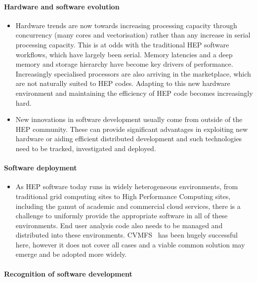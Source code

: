 \documentclass[12pt,a4paper]{article}
\begin{document}
\paragraph{Hardware and software evolution}

\begin{itemize}
\item
    Hardware trends are now towards increasing processing capacity through
  concurrency (many cores and vectorisation) rather than any increase in
  serial processing capacity. This is at odds with the traditional HEP
  software workflows, which have largely been serial. Memory latencies
  and a deep memory and storage hierarchy have become key drivers of
  performance. Increasingly specialised processors are also arriving in
  the marketplace, which are not naturally suited to HEP codes. Adapting
  to this new hardware environment and maintaining the efficiency of HEP
  code becomes increasingly hard.
  \item
    New innovations in software development usually come from outside of
  the HEP community. These can provide significant advantages in
  exploiting new hardware or aiding efficient distributed development
  and such technologies need to be tracked, investigated and deployed.
\end{itemize}

\paragraph{Software deployment}

\begin{itemize}
\item
    As HEP software today runs in widely heterogeneous environments, from
  traditional grid computing sites to High Performance Computing sites,
  including the gamut of academic and commercial cloud services, there
  is a challenge to uniformly provide the appropriate software in all of
  these environments. End user analysis code also needs to be managed
  and distributed into these environments. CVMFS~\cite{7310920} has been hugely
  successful here, however it does not cover all cases and a viable
  common solution may emerge and be adopted more widely.
\end{itemize}

\paragraph{Recognition of software development}
\end{document}

